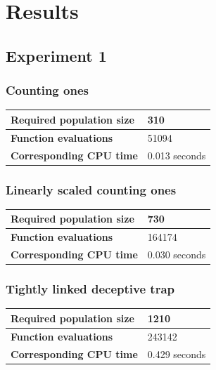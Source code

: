 \documentclass[12pt]{article}
\theoremstyle{definition}
\begin{document}
\maketitle

\section*{Results}

\subsection*{Experiment 1}

\subsubsection*{Counting ones}
\begin{table}[H]
\begin{tabular}{|ll|}
\hline
\textbf{Required population size} & 310              \\ \hline
\textbf{Function evaluations}     & 51094            \\ \hline
\textbf{Corresponding CPU time}   & 0.013 seconds    \\ \hline
\end{tabular}
\end{table}


\subsubsection*{Linearly scaled counting ones}
\begin{table}[H]
\begin{tabular}{|ll|}
\hline
\textbf{Required population size} & 730              \\ \hline
\textbf{Function evaluations}     & 164174            \\ \hline
\textbf{Corresponding CPU time}   & 0.030 seconds    \\ \hline
\end{tabular}
\end{table}

\subsubsection*{Tightly linked deceptive trap}
\begin{table}[H]
\begin{tabular}{|ll|}
\hline
\textbf{Required population size} & 1210              \\ \hline
\textbf{Function evaluations}     & 243142            \\ \hline
\textbf{Corresponding CPU time}   & 0.429 seconds    \\ \hline
\end{tabular}
\end{table}
\end{document}
